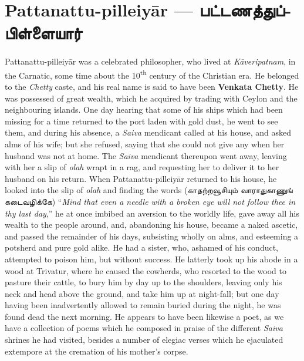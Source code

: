 \documentclass{article}
\newcommand{\TamilText}[1]{\texttamil{#1}}
\newcommand{\TamilBold}[1]{\texttamil{\textbf{#1}}}
\newcommand{\tam}[1]{\TamilText{#1}}
\newcommand{\tambold}[1]{\TamilBold{#1}}
\begin{document}
\section{Pattanattu-pilleiy\={a}r --- \tambold{பட்டணத்துப்பிள்ளையார்}}
\paragraph{}
Pattanattu-pilleiy\={a}r was a celebrated philosopher, who lived at \emph{K\={a}veripatnam}, in the Carnatic, some time about the 10\textsuperscript{th} century of the Christian era. He belonged to the \emph{Chetty} caste, and his real name is said to have been \textbf{Venkata Chetty}. He was possessed of great wealth, which he acquired by trading with Ceylon and the neighbouring islands. One day hearing that some of his ships which had been missing for a time returned to the port laden with gold dust, he went to see them, and during his absence, a \emph{Saiva} mendicant called at his house, and asked alms of his wife; but she refused, saying that she could not give any when her husband was not at home. The \emph{Saiva} mendicant thereupon went away, leaving with her a slip of \emph{olah} wrapt in a rag, and requesting her to deliver it to her husband on his return. When Pattanattu-pilleiy\={a}r returned to his house, he looked into the slip of \emph{olah} and finding the words (\tam{காதற்றவூசியும் வாராதுகாணுங் கடைவழிக்கே}) ``\emph{Mind that even a needle with a broken eye will not follow thee in thy last day},'' he at once imbibed an aversion to the worldly life, gave away all his wealth to the people around, and, abandoning his house, became a naked ascetic, and passed the remainder of his days, subsisting wholly on alms, and esteeming a potsherd and pure gold alike. He had a sister, who, ashamed of his conduct, attempted to poison him, but without success. He latterly took up his abode in a wood at Trivatur, where he caused the cowherds, who resorted to the wood to pasture their cattle, to bury him by day up to the shoulders, leaving only his neck and head above the ground, and take him up at night-fall; but one day having been inadvertently allowed to remain buried during the night, he was found dead the next morning. He appears to have been likewise a poet, as we have a collection of poems which he composed in praise of the different \emph{Saiva} shrines he had visited, besides a number of elegiac verses which he ejaculated extempore at the cremation of his mother's corpse.
\end{document}
